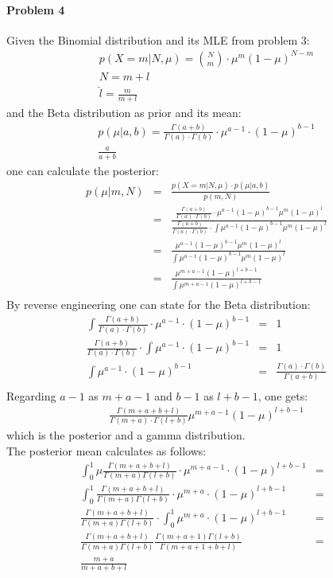 \documentclass{article}
\begin{document}
\paragraph*{Problem 4}
Given the Binomial distribution and its MLE from problem 3:
\begin{eqnarray}
p(X=m | N,\mu) = {N \choose m} \cdot \mu ^m (1- \mu)^{N-m}\\
N = m+l\\
\hat{l} = \frac{m}{m+l}
\end{eqnarray}
and the Beta distribution as prior and its mean:
\begin{eqnarray}
p(\mu | a,b) = \frac{\Gamma(a+b)}{\Gamma(a) \cdot \Gamma(b)} \cdot \mu^{a-1} \cdot (1-\mu)^{b-1}\\
\frac{a}{a+b}
\end{eqnarray}
one can calculate the posterior:
\begin{eqnarray}
p(\mu | m,N) &=& \frac{p(X=m | N,\mu) \cdot p(\mu | a,b)}{p(m,N)}\\
 &=&  \frac{\frac{\Gamma(a+b)}{\Gamma(a)\cdot \Gamma(b)} \cdot \mu ^{a-1} (1-\mu)^{b-1} \mu^{m} (1-\mu)^l}{\frac{\Gamma(a+b)}{\Gamma(a)\cdot \Gamma(b)} \cdot \int \mu^{a-1} (1-\mu)^{b-1}\mu^m(1-\mu)^l} \\
 &=&  \frac{\mu ^{a-1} (1-\mu)^{b-1} \mu^{m} (1-\mu)^l}{\int \mu^{a-1} (1-\mu)^{b-1}\mu^m(1-\mu)^l} \\
  &=&  \frac{\mu ^{m+a-1} (1-\mu)^{l+b-1}}{\int \mu^{m+a-1} (1-\mu)^{l+b-1}} \\
\end{eqnarray}
By reverse engineering one can state for the Beta distribution:
\begin{eqnarray}
\int \frac{\Gamma(a+b)}{\Gamma(a) \cdot \Gamma(b)} \cdot \mu^{a-1} \cdot (1-\mu)^{b-1} &=& 1\\
 \frac{\Gamma(a+b)}{\Gamma(a) \cdot \Gamma(b)} \cdot \int  \mu^{a-1} \cdot (1-\mu)^{b-1} &=& 1\\
 \int  \mu^{a-1} \cdot (1-\mu)^{b-1} &=& \frac{\Gamma(a) \cdot \Gamma(b)}{\Gamma(a+b)}\\
\end{eqnarray}
Regarding $a-1$ as $m+a-1$ and $b-1$ as $l+b-1$, one gets:
\begin{eqnarray}
\frac{\Gamma(m+a+b+l)}{\Gamma(m+a) \cdot \Gamma(l+b)}\mu^{m+a-1}(1-\mu)^{l+b-1}
\end{eqnarray}
which is the posterior and a gamma distribution.\\
The posterior mean calculates as follows:
\begin{eqnarray}
\int_0^1 \mu \frac{\Gamma(m+a+b+l)}{\Gamma(m+a) \Gamma(l+b)} \cdot \mu^{m+a-1} \cdot (1-\mu)^{l+b-1} &=&\\
\int_0^1 \frac{\Gamma(m+a+b+l)}{\Gamma(m+a) \Gamma(l+b)} \cdot \mu^{m+a} \cdot (1-\mu)^{l+b-1} &=&\\
\frac{\Gamma(m+a+b+l)}{\Gamma(m+a) \Gamma(l+b)} \cdot \int_0^1 \mu^{m+a} \cdot (1-\mu)^{l+b-1} &=&\\
\frac{\Gamma(m+a+b+l)}{\Gamma(m+a) \Gamma(l+b)} \frac{\Gamma(m+a+1)\Gamma(l+b)}{\Gamma(m+a+1+b+l)} &=&\\
\frac{m+a}{m+a+b+l}\\
\end{eqnarray}
\end{document}
